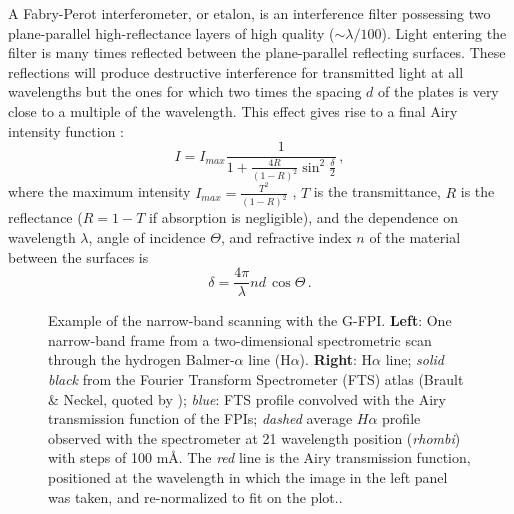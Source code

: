 A Fabry-Perot interferometer, or etalon, is an interference filter possessing two plane-parallel  high-reflectance layers of high quality ($ \sim\lambda/100$). Light entering the filter is many times reflected between the plane-parallel reflecting surfaces. These reflections will produce  destructive interference for transmitted light at all wavelengths but the ones for which two times the spacing $d$ of the plates is very close to a multiple of the wavelength. This effect gives rise to a final Airy intensity function \citep{Born:1999lr}:
\begin{equation}
I=I_{max}\frac{1}{1+\frac{4R}{(1-R)^{2}}\sin^{2}\frac{\delta}{2}} \, ,
\end{equation}
where  the maximum intensity $I_{max}=\frac{T^{2}}{(1-R)^{2}}$ , $T$ is the transmittance, $R$ is the reflectance ($R=1-T$ if absorption is negligible), and the dependence on wavelength $\lambda$, angle of incidence $\Theta$, and refractive index $n$ of the material between the surfaces is
\begin{equation}
\label{eq:fpid}
\delta=\frac{4\pi}{\lambda}nd\,\cos\Theta \, .
\end{equation}


\begin{figure}[t]
\centering
  \quad%
\caption{Example of the narrow-band scanning with the G-FPI. {\bf Left}: One narrow-band frame from a two-dimensional spectrometric scan through the hydrogen Balmer-$\alpha$ line (H$\alpha$).{ \bf Right}: H$\alpha$ line; \emph{solid black} from the Fourier Transform Spectrometer (FTS) atlas  (Brault \& Neckel, quoted by \citealt{Neckel:1999lr}); \emph{blue}: FTS profile convolved with the Airy transmission function of the FPIs; \emph{dashed} average $H\alpha$ profile observed with the spectrometer at 21 wavelength position (\emph{rhombi}) with steps of 100 m\AA. The \emph{red} line is the Airy transmission function, positioned at the wavelength in which the image in the left panel was taken, and re-normalized to fit on the plot..}
\label{fpi:scan}
\end{figure}


